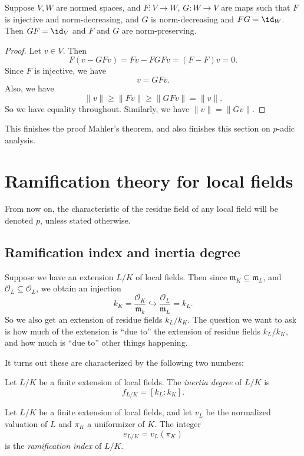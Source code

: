 \documentclass[a4paper]{article}
\begin{document}
\begin{lemma}
  Suppose $V, W$ are normed spaces, and $F: V \to W$, $G: W \to V$ are maps such that $F$ is injective and norm-decreasing, and $G$ is norm-decreasing and $FG = \id_W$. Then $GF = \id_V$ and $F$ and $G$ are norm-preserving.
\end{lemma}

\begin{proof}
  Let $v \in V$. Then
  \[
    F(v - GFv) = Fv - FGF v = (F - F)v = 0.
  \]
  Since $F$ is injective, we have
  \[
    v = GF v.
  \]
  Also, we have
  \[
    \|v\| \geq \|Fv\| \geq \|GFv\| = \|v\|.
  \]
  So we have equality throughout. Similarly, we have $\|v\| = \|Gv\|$.
\end{proof}
This finishes the proof Mahler's theorem, and also finishes this section on $p$-adic analysis.

\section{Ramification theory for local fields}
From now on, the characteristic of the residue field of any local field will be denoted $p$, unless stated otherwise.

\subsection{Ramification index and inertia degree}
Suppose we have an extension $L/K$ of local fields. Then since $\mathfrak{m}_K \subseteq \mathfrak{m}_L$, and $\mathcal{O}_L \subseteq \mathcal{O}_L$, we obtain an injection
\[
  k_K = \frac{\mathcal{O}_K}{\mathfrak{m}_k} \hookrightarrow \frac{\mathcal{O}_L}{\mathfrak{m}_L} = k_L.
\]
So we also get an extension of residue fields $k_L/k_K$. The question we want to ask is how much of the extension is ``due to'' the extension of residue fields $k_L/k_K$, and how much is ``due to'' other things happening.

It turns out these are characterized by the following two numbers:
\begin{defi}
  Let $L/K$ be a finite extension of local fields. The \emph{inertia degree} of $L/K$ is
  \[
    f_{L/K} = [k_L:k_K].
  \]
\end{defi}

\begin{defi}
  Let $L/K$ be a finite extension of local fields, and let $v_L$ be the normalized valuation of $L$ and $\pi_K$ a uniformizer of $K$. The integer
  \[
    e_{L/K} = v_L(\pi_K)
  \]
  is the \emph{ramification index} of $L/K$.
\end{defi}
\end{document}
